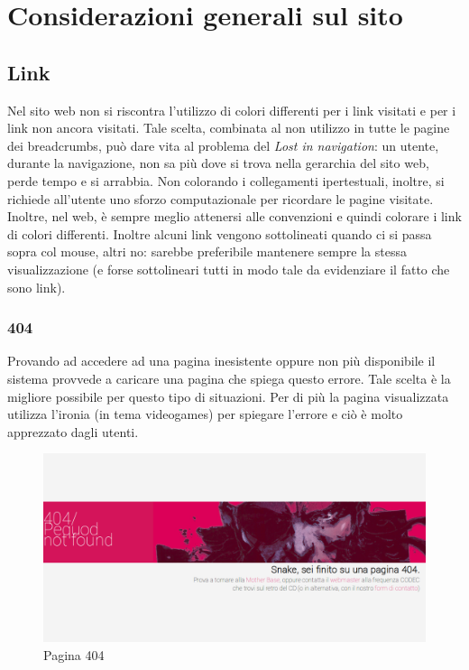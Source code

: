 \documentclass[../ProgettoTecWeb2.tex]{subfiles}
\begin{document}
\section{Considerazioni generali sul sito}
	
	\subsection{Link}
	Nel sito web non si riscontra l'utilizzo di colori differenti per i link visitati e per i link non ancora visitati. Tale scelta, combinata al non utilizzo in tutte le pagine dei breadcrumbs, può dare vita al problema del \textit{Lost in navigation}: un utente, durante la navigazione, non sa più dove si trova nella gerarchia del sito web, perde tempo e si arrabbia. Non colorando i collegamenti ipertestuali, inoltre, si richiede all'utente uno sforzo computazionale per ricordare le pagine visitate. Inoltre, nel web, è sempre meglio attenersi alle convenzioni e quindi colorare i link di colori differenti. Inoltre alcuni link vengono sottolineati quando ci si passa sopra col mouse, altri no: sarebbe preferibile mantenere sempre la stessa visualizzazione (e forse sottolineari tutti in modo tale da evidenziare il fatto che sono link).

		\subsubsection{404}
		Provando ad accedere ad una pagina inesistente oppure non più disponibile il sistema provvede a caricare una pagina che spiega questo errore. Tale scelta è la migliore possibile per questo tipo di situazioni. Per di più la pagina visualizzata utilizza l'ironia (in tema videogames) per spiegare l'errore e ciò è molto apprezzato dagli utenti.
		\begin{figure} [H]
			\centering
			\includegraphics[scale=0.3]{img/404}
			\caption{Pagina 404}
		\end{figure}
\end{document}

